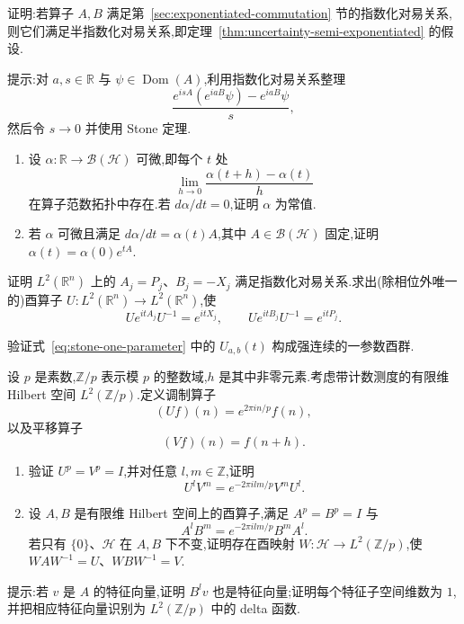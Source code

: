 {\begin{exercise}[半指数化对易关系]\label{ex:stone-semi-exponentiated}
证明:若算子 $A,B$ 满足第~\ref{sec:exponentiated-commutation} 节的指数化对易关系,则它们满足半指数化对易关系,即定理~\ref{thm:uncertainty-semi-exponentiated} 的假设.

提示:对 $a,s\in\mathbb R$ 与 $\psi\in\operatorname{Dom}(A)$,利用指数化对易关系整理
\[
\frac{e^{isA}(e^{iaB}\psi)-e^{iaB}\psi}{s},
\]
然后令 $s\to0$ 并使用 Stone 定理.
\end{exercise}

\begin{exercise}[有界算子微分方程]\label{ex:stone-ode}
\begin{enumerate}
\item 设 $\alpha:\mathbb R\to\mathcal B(\mathcal H)$ 可微,即每个 $t$ 处
\[
\lim_{h\to0}\frac{\alpha(t+h)-\alpha(t)}h
\]
在算子范数拓扑中存在.若 $d\alpha/dt=0$,证明 $\alpha$ 为常值.
\item 若 $\alpha$ 可微且满足 $d\alpha/dt=\alpha(t)A$,其中 $A\in\mathcal B(\mathcal H)$ 固定,证明 $\alpha(t)=\alpha(0)e^{tA}$.
\end{enumerate}
\end{exercise}

\begin{exercise}\label{ex:stone-fourier}
证明 $L^2(\mathbb R^n)$ 上的 $A_j=P_j$、$B_j=-X_j$ 满足指数化对易关系.求出(除相位外唯一的)酉算子 $U:L^2(\mathbb R^n)\to L^2(\mathbb R^n)$,使
\[
Ue^{itA_j}U^{-1}=e^{itX_j},
\qquad
Ue^{itB_j}U^{-1}=e^{itP_j}.
\]
\end{exercise}

\begin{exercise}\label{ex:stone-weyl-group}
验证式~\eqref{eq:stone-one-parameter} 中的 $U_{a,b}(t)$ 构成强连续的一参数酉群.
\end{exercise}

\begin{exercise}\label{ex:finite-stone-von-neumann}
设 $p$ 是素数,$\mathbb Z/p$ 表示模 $p$ 的整数域,$h$ 是其中非零元素.考虑带计数测度的有限维 Hilbert 空间 $L^2(\mathbb Z/p)$.定义调制算子
\[
(Uf)(n)=e^{2\pi in/p}f(n),
\]
以及平移算子
\[
(Vf)(n)=f(n+h).
\]
\begin{enumerate}
\item 验证 $U^p=V^p=I$,并对任意 $l,m\in\mathbb Z$,证明
\[
U^lV^m=e^{-2\pi ilm/p}V^mU^l.
\]
\item 设 $A,B$ 是有限维 Hilbert 空间上的酉算子,满足 $A^p=B^p=I$ 与
\[
A^lB^m=e^{-2\pi ilm/p}B^mA^l.
\]
若只有 $\{0\}$、$\mathcal H$ 在 $A,B$ 下不变,证明存在酉映射 $W:\mathcal H\to L^2(\mathbb Z/p)$,使 $WAW^{-1}=U$、$WBW^{-1}=V$.
\end{enumerate}
提示:若 $v$ 是 $A$ 的特征向量,证明 $B^lv$ 也是特征向量;证明每个特征子空间维数为 $1$,并把相应特征向量识别为 $L^2(\mathbb Z/p)$ 中的 delta 函数.
\end{exercise}

}
